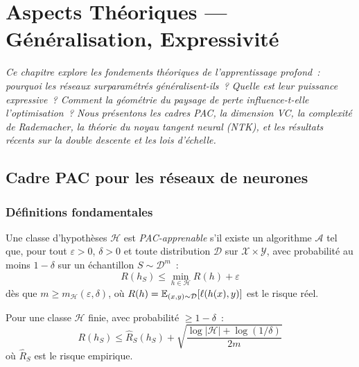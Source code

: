 \chapter{Aspects Th\'eoriques --- G\'en\'eralisation, Expressivit\'e}
\label{ch:theorie}

\noindent\textit{Ce chapitre explore les fondements th\'eoriques de l'apprentissage profond~:
pourquoi les r\'eseaux surparam\'etr\'es g\'en\'eralisent-ils~? Quelle est
leur puissance expressive~? Comment la g\'eom\'etrie du paysage de perte
influence-t-elle l'optimisation~? Nous pr\'esentons les cadres PAC,
la dimension VC, la complexit\'e de Rademacher, la th\'eorie du noyau tangent
neural (NTK), et les r\'esultats r\'ecents sur la double descente et
les lois d'\'echelle.}\medskip

\section{Cadre PAC pour les r\'eseaux de neurones}
\label{sec:pac-learning}

\subsection{D\'efinitions fondamentales}

\begin{definition}
\label{def:pac}
Une classe d'hypoth\`eses $\mathcal{H}$ est \emph{PAC-apprenable} s'il existe
un algorithme $\mathcal{A}$ tel que, pour tout $\varepsilon > 0$, $\delta > 0$
et toute distribution $\mathcal{D}$ sur $\mathcal{X} \times \mathcal{Y}$,
avec probabilit\'e au moins $1 - \delta$ sur un \'echantillon
$S \sim \mathcal{D}^m$~:
\begin{equation}
R(h_S) \leq \min_{h \in \mathcal{H}} R(h) + \varepsilon
\end{equation}
d\`es que $m \geq m_{\mathcal{H}}(\varepsilon, \delta)$, o\`u
$R(h) = \mathbb{E}_{(x,y) \sim \mathcal{D}}[\ell(h(x), y)]$ est le risque r\'eel.
\end{definition}

\begin{theoreme}
\label{thm:pac-bound}
Pour une classe $\mathcal{H}$ finie, avec probabilit\'e $\geq 1 - \delta$~:
\begin{equation}
R(h_S) \leq \hat{R}_S(h_S) + \sqrt{\frac{\log|\mathcal{H}| + \log(1/\delta)}{2m}}
\end{equation}
o\`u $\hat{R}_S$ est le risque empirique.
\end{theoreme}

